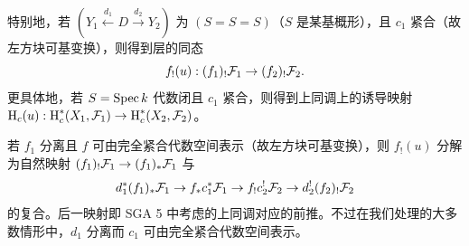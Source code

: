 特别地，若 $(Y_1\xleftarrow{d_1} D\xrightarrow{d_2} Y_2)$ 为 $(S=S=S)$（$S$ 是某基概形），且 $c_1$ 紧合（故左方块可基变换），则得到层的同态
\[f_!(u): (f_1)_!{\mathcal F}_1\to (f_2)_!{\mathcal F}_2.\]
更具体地，若 $S=\operatorname{Spec} k$ 代数闭且 $c_1$ 紧合，则得到上同调上的诱导映射 $\operatorname{H}_c(u): \operatorname{H}_c^*(X_1,{\mathcal F}_1)\to \operatorname{H}_c^*(X_2,{\mathcal F}_2)$。

\begin{rmk}
若 $f_1$ 分离且 $f$ 可由完全紧合代数空间表示（故左方块可基变换），则 $f_!(u)$ 分解为自然映射 $(f_1)_!{\mathcal F}_1\to (f_1)_*{\mathcal F}_1$ 与
\[d_1^*(f_1)_*{\mathcal F}_1\to f_*c_1^*{\mathcal F}_1\to f_!c_2^!{\mathcal F}_2\to d_2^!(f_2)_!{\mathcal F}_2\]
的复合。后一映射即 SGA 5 中考虑的上同调对应的前推。不过在我们处理的大多数情形中，$d_1$ 分离而 $c_1$ 可由完全紧合代数空间表示。
\end{rmk}
